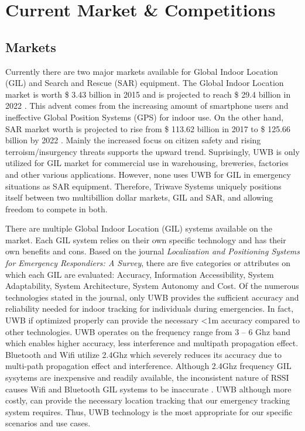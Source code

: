 

\setcounter{section}{2}
\section{Current Market \& Competitions}

\subsection{Markets}
Currently there are two major markets available for Global Indoor Location (GIL) and Search and Rescue (SAR) equipment. 
The Global Indoor Location market is worth \$ 3.43 billion in 2015 and is projected to reach \$ 29.4 billion in 2022 \cite{R3-1}. This advent 
comes from the increasing amount of smartphone users and ineffective Global Position Systems (GPS) for indoor use. On the other hand, SAR market 
worth is projected to rise from \$ 113.62 billion in 2017 to \$ 125.66 billion by 2022 \cite{R3-2}. Mainly the increased focus on citizen 
safety and rising terroism/insurgency threats supports the upward trend. Suprisingly, UWB is only utilized for GIL market for commercial use in 
warehousing, breweries, factories and other various applications. However, none uses UWB for GIL in emergency situations as SAR equipment. 
Therefore, Triwave Systems uniquely positions itself between two multibillion dollar markets, GIL and SAR, and allowing freedom to compete in both. 

\bigskip

There are multiple Global Indoor Location (GIL) systems available on the market. Each GIL system relies on their own specific technology and has 
their own benefits and cons. Based on the journal \textit{Localization and Positioning Systems for Emergency Respondiers: A Survey}\cite{R3-3}, 
there are five categories or attributes on which each GIL are evaluated: Accuracy, Information Accessibility, System Adaptability, System 
Architecture, System Autonomy and Cost. Of the numerous technologies stated in the journal, only UWB provides the sufficient accuracy and 
reliability needed for indoor tracking for individuals during emergencies. In fact, UWB if optimized properly can provide the necessary <1m 
accuracy compared to other technologies. UWB operates on the frequency range from 3 – 6 Ghz band which enables higher accuracy, less interference 
and multipath propagation effect. Bluetooth and Wifi utilize 2.4Ghz which severely reduces its accuracy due to multi-path propagation effect 
and interference. Although 2.4Ghz frequency GIL sysytems are inexpensive and readily available, the inconsistent nature of RSSI causes Wifi and 
Bluetooth GIL systems to be inaccurate \cite{R3-4}. UWB although more costly, can provide the necessary location tracking that our emergency 
tracking system requires. Thus, UWB technology is the most appropriate for our specific scenarios and use cases.

